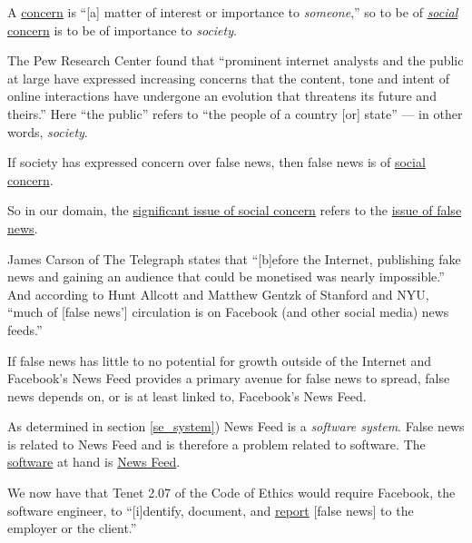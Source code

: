 \par A \ul{concern} is ``[a] matter of interest or importance to \emph{someone},'' \cite{oxford} so to be of \ul{\emph{social} concern} is to be of importance to \emph{society}.

\par The Pew Research Center found that ``prominent internet analysts and the public at large have expressed increasing concerns that the content, tone and intent of online interactions have undergone an evolution that threatens its future and theirs.'' \cite{pew_future} Here ``the public'' refers to ``the people of a country [or] state'' \cite{merriam_webster} --- in other words, \emph{society}. \cite{oxford}

\par If society has expressed concern over false news, then false news is of \ul{social concern}.

\par So in our domain, the \ul{significant issue of social concern} refers to the \ul{issue of false news}.


\par James Carson of The Telegraph states that ``[b]efore the Internet, publishing fake news and gaining an audience that could be monetised was nearly impossible.'' \cite{telegraph_fn}  And according to Hunt Allcott and Matthew Gentzk of Stanford and NYU, ``much of [false news'] circulation is on Facebook (and other social media) news feeds.'' \cite{socialmedia_fn}

\par If false news has little to no potential for growth outside of the Internet and Facebook's News Feed provides a primary avenue for false news to spread, false news depends on, or is at least linked to, Facebook's News Feed.

\par As determined in section \ref{se_system}) News Feed is a \emph{software system}. False news is related to News Feed and is therefore a problem related to software. The \ul{software} at hand is \ul{News Feed}.


\par We now have that Tenet 2.07 of the Code of Ethics would require Facebook, the software engineer, to ``[i]dentify, document, and \ul{report} [false news] to the employer or the client.'' \cite{se_code}

